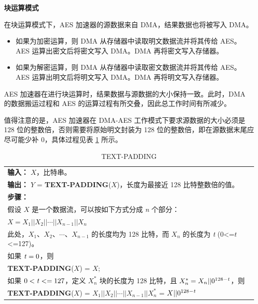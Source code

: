 \documentclass[main\_\_CN.tex]{subfiles}
\begin{document}
\textbf{块运算模式}

在块运算模式下，AES 加速器的源数据来自 DMA，结果数据也将被写入 DMA。
\begin{itemize}
    \item 如果为加密运算，则 DMA 从存储器中读取明文数据流并将其传给 AES。AES 运算出密文后将密文写入 DMA。DMA 再将密文写入存储器。
    \item 如果为解密运算，则 DMA 从存储器中读取密文数据流并将其传给 AES。AES 运算出明文后将明文写入 DMA。DMA 再将明文写入存储器。
\end{itemize}

AES 加速器在进行块运算时，结果数据与源数据的大小保持一致。此时，DMA 的数据搬运过程和 AES 的运算过程有所交叠，因此总工作时间有所减少。

\label{api:textpadding} 值得注意的是，AES 加速器在 DMA-AES 工作模式下要求源数据的大小必须是 128 位的整数倍，否则需要将原始明文封装为 128 位的整数倍，即在源数据末尾应尽可能少补 0，具体过程见表 \ref{tab:aes-define-func-text-padding} 所示。
\begin{longtable}[c]{|p{15cm}|}
\caption{TEXT-PADDING}
\label{tab:aes-define-func-text-padding}\\
\hline
\rowcolor{lightgray}
\multirow{1}{*}{%
{\bfseries 函数：} {\bfseries TEXT-PADDING}(\ ) } \\\hline
{\bfseries 输入：} $X$，比特串。\\
{\bfseries 输出：} $Y$ = {\bfseries TEXT-PADDING}($X$)，长度为最接近 128 比特整数倍的值。 \\\hline
{\bfseries 步骤：}\\
\hspace{1.15cm} 假设 $X$ 是一个数据流，可以按如下方式分成 {\it{n}} 个部分：\\
\phantom{aaaaaaa}$X = X_{1} || X_{2} || \cdots || X_{n-1} || X_{n}$ \\
\phantom{aaaaaaa}此处，$X_{1}$、$X_{2}$、$\cdots$、$X_{n-1}$ 的长度均为 128 比特，而 $X_{n}$ 的长度为 {\it{t}} (0<=$t$<=127)。\\
\phantom{aaaaaaa}如果 ${\it{t}} = 0$，则\\
\phantom{aaaaaaa}\phantom{空空空空空} {\bfseries TEXT-PADDING}($X$) = $X$;\\
\phantom{aaaaaaa}如果 $0<{\it{t}} <= 127$，定义 $X_{n}^{*}$ 块的长度为 128 比特，且 $X_{n}^{*} = X_{n} || 0^{128-{\it{t}}}$，则\\
\phantom{aaaaaaa}\phantom{空空空空空} {\bfseries TEXT-PADDING}($X$) = $X_{1} || X_{2} || \cdots || X_{n-1} || X_{n}^{*}$  = $X || 0^{128-{\it{t}}}$\\
\hline
\end{longtable}
\end{document}
